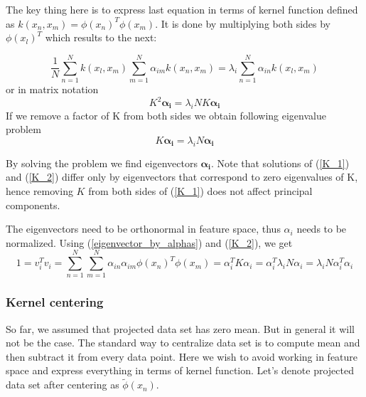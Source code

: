 The key thing here is to express last equation in terms of kernel function defined as $k(x_n, x_m) = \phi(x_n)^T\phi(x_m)$. It is done by multiplying both sides by $\phi(x_l)^T$ which results to the next:

\begin{equation}
\dfrac{1}{N}\sum_{n=1}^{N}{k(x_l, x_m)} \sum_{m=1}^{N}{\alpha_{im}k(x_n, x_m)} = \lambda_i \sum_{n=1}^{N}{\alpha_{in}k(x_l, x_m)}
\end{equation}
or in matrix notation
\begin{equation}\label{K_1}
K^2 \bm{\alpha_i} = \lambda_i N K \bm{\alpha_i}
\end{equation}
If we remove a factor of K from both sides we obtain following eigenvalue problem
\begin{equation}\label{K_2}
K \bm{\alpha_i} = \lambda_i N \bm{\alpha_i}
\end{equation}

By solving the problem we find eigenvectors $\bm{\alpha_i}$. Note that solutions of (\ref{K_1}) and (\ref{K_2}) differ only by eigenvectors that correspond to zero eigenvalues of K, hence removing $K$ from both sides of (\ref{K_1}) does not affect principal components.  

The eigenvectors need to be orthonormal in feature space, thus $\alpha_i$ needs to be normalized. Using (\ref{eigenvector_by_alphas}) and (\ref{K_2}), we get
\begin{equation}
1 = v_i^Tv_i = \sum_{n=1}^{N}\sum_{m=1}^{N}{\alpha_{in}\alpha_{im}\phi(x_n)^T\phi(x_m)} = \alpha_i^TK\alpha_i = \alpha_i^T\lambda_iN\alpha_i = \lambda_iN\alpha_i^T\alpha_i
\end{equation}

\subsubsection{Kernel centering}
So far, we assumed that projected data set has zero mean. But in general it will not be the case. The standard way to centralize data set is to compute mean and then subtract it from every data point.
Here we wish to avoid working in feature space and express everything in terms of kernel function. Let's denote projected data set after centering as $\widetilde{\phi}(x_n)$.

